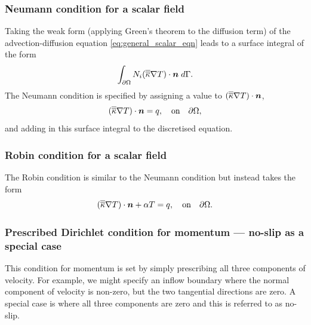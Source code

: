 \subsubsection{Neumann condition for a scalar field}\label{sect:bc_scalar_neumann}

Taking the weak form (applying Green's theorem to the diffusion term) of the advection-diffusion equation \eqref{eq:general_scalar_eqn} leads to a surface integral of the form
\begin{equation*}
\int_{\partial\Omega} N_i (\overline{\overline{\kappa}}\nabla T)\cdot{\mbox{\boldmath$n$}} \;d\Gamma.
\end{equation*}
The Neumann condition is specified by assigning a value to $(\overline{\overline{\kappa}}\nabla T)\cdot{\mbox{\boldmath$n$}}$, \eg
\begin{equation*}
(\overline{\overline{\kappa}}\nabla T)\cdot{\mbox{\boldmath$n$}} = q,\quad \textrm{on}\quad \partial\Omega,
\end{equation*}
and adding in this surface integral to the discretised equation.


\subsubsection{Robin condition for a scalar field}\label{sect:bc_scalar_robin}
The Robin condition is similar to the Neumann condition but instead takes the form
\begin{equation*}
(\overline{\overline{\kappa}}\nabla T)\cdot{\mbox{\boldmath$n$}} + \alpha T = q,\quad \textrm{on}\quad \partial\Omega.
\end{equation*}


\subsubsection{Prescribed Dirichlet condition for momentum --- no-slip as a special case}\label{sect:bc_vector_dirichlet}
This condition for momentum is set by simply prescribing all three components of
velocity. For example, we might specify an inflow boundary where the normal component
of velocity is non-zero, but the two tangential directions are zero. A special case is
where all three components are zero and this is referred to as no-slip.



